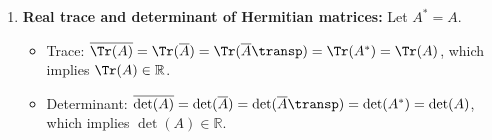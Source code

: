 \begin{exercisesolution*}
\begin{enumerate}[label=\textbf{(\alph*)}]
    \item \textbf{Real trace and determinant of Hermitian matrices:}
    Let $A^* = A$.
    \begin{itemize}
        \item Trace: $\overline{\Tr(A)} = \Tr(\overline{A}) = \Tr(\overline{A}\transp) = \Tr(A^*) = \Tr(A)$, which implies $\Tr(A) \in \mathbb{R}$.
        \item Determinant: $\overline{\det(A)} = \det(\overline{A}) = \det(\overline{A}\transp) = \det(A^*) = \det(A)$, which implies $\det(A) \in \mathbb{R}$. \qedhere
    \end{itemize}
\end{enumerate}
\end{exercisesolution*}

